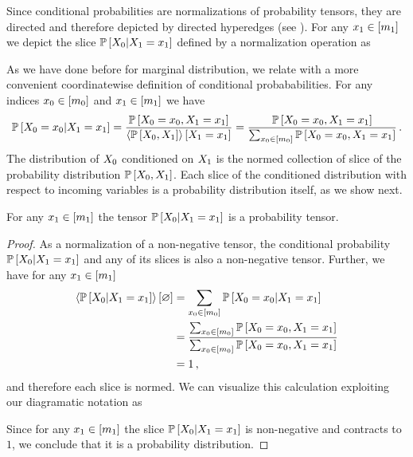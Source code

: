 Since conditional probabilities are normalizations of probability tensors, they are directed and therefore depicted by directed hyperedges (see ).
For any $x_{1}\in[m_{1}]$ we depict the slice $\mathbb{P}\left[X_{0}|X_{1}=x_{1}\right]$ defined by a normalization operation as
\begin{center}
    
\end{center}

As we have done before for marginal distribution, we relate  with a more convenient coordinatewise definition of conditional probababilities.
For any indices $x_{0}\in[m_{0}]$ and $x_{1}\in[m_{1}]$ we have
\begin{align*}
    \mathbb{P}\left[X_{0}=x_{0}|X_{1}=x_{1}\right]
    = \frac{\mathbb{P}\left[X_{0}=x_{0},X_{1}=x_{1}\right]}{\left\langle \mathbb{P}\left[X_{0},X_{1}\right]\right\rangle \left[ X_{1}=x_{1} \right]}
    = \frac{\mathbb{P}\left[X_{0}=x_{0},X_{1}=x_{1}\right]}{\sum_{x_{0}\in[m_{0}]} \mathbb{P}\left[X_{0}=x_{0},X_{1}=x_{1}\right]} \, .
\end{align*}
The distribution of $X_{0}$ conditioned on $X_{1}$ is the normed collection of slice of the probability distribution $\mathbb{P}\left[X_{0},X_{1}\right]$.
Each slice of the conditioned distribution with respect to incoming variables is a probability distribution itself, as we show next.

\begin{theorem}
    \label{the:conditionalContraction}
    For any $x_{1}\in[m_{1}]$ the tensor $\mathbb{P}\left[X_{0}|X_{1}=x_{1}\right]$ is a probability tensor.
\end{theorem}
\begin{proof}
    As a normalization of a non-negative tensor, the conditional probability $\mathbb{P}\left[X_{0}|X_{1}=x_{1}\right]$ and any of its slices is also a non-negative tensor.
    Further, we have for any $x_{1}\in[m_{1}]$
    \begin{align*}
        \left\langle \mathbb{P}\left[X_{0}|X_{1}=x_{1}\right]\right\rangle \left[ \varnothing \right]
        & = \sum_{x_{0}\in[m_{0}]} \mathbb{P}\left[X_{0}=x_{0}|X_{1}=x_{1}\right] \\
        &= \frac{\sum_{x_{0}\in[m_{0}]}\mathbb{P}\left[X_{0}=x_{0},X_{1}=x_{1}\right]}{\sum_{x_{0}\in[m_{0}]}\mathbb{P}\left[X_{0}=x_{0},X_{1}=x_{1}\right]} \\
        &= 1 \, ,
    \end{align*}
    and therefore each slice is normed.
    We can visualize this calculation exploiting our diagramatic notation as
    \begin{center}
        
    \end{center}
    Since for any $x_{1}\in[m_{1}]$ the slice $\mathbb{P}\left[X_{0}|X_{1}=x_{1}\right]$ is non-negative and contracts to $1$, we conclude that it is a probability distribution.
\end{proof}

